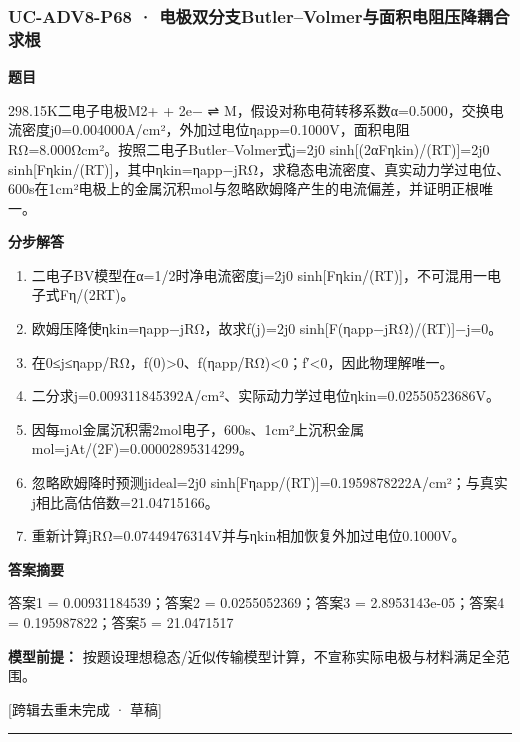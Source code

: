 \documentclass[UTF8,11pt,a4paper]{ctexart}
\begin{document}
\subsubsection*{UC-ADV8-P68 · 电极双分支Butler–Volmer与面积电阻压降耦合求根}
\noindent\textbf{题目}\par
298.15K二电子电极M2+ + 2e− ⇌ M，假设对称电荷转移系数α=0.5000，交换电流密度j0=0.004000A/cm²，外加过电位ηapp=0.1000V，面积电阻RΩ=8.000Ωcm²。按照二电子Butler–Volmer式j=2j0 sinh[(2αFηkin)/(RT)]=2j0 sinh[Fηkin/(RT)]，其中ηkin=ηapp−jRΩ，求稳态电流密度、真实动力学过电位、600s在1cm²电极上的金属沉积mol与忽略欧姆降产生的电流偏差，并证明正根唯一。\par
\medskip\noindent\textbf{分步解答}
\begin{enumerate}
\item 二电子BV模型在α=1/2时净电流密度j=2j0 sinh[Fηkin/(RT)]，不可混用一电子式Fη/(2RT)。
\item 欧姆压降使ηkin=ηapp−jRΩ，故求f(j)=2j0 sinh[F(ηapp−jRΩ)/(RT)]−j=0。
\item 在0≤j≤ηapp/RΩ，f(0)>0、f(ηapp/RΩ)<0；f′<0，因此物理解唯一。
\item 二分求j=0.009311845392A/cm²、实际动力学过电位ηkin=0.02550523686V。
\item 因每mol金属沉积需2mol电子，600s、1cm²上沉积金属mol=jAt/(2F)=0.00002895314299。
\item 忽略欧姆降时预测jideal=2j0 sinh[Fηapp/(RT)]=0.1959878222A/cm²；与真实j相比高估倍数=21.04715166。
\item 重新计算jRΩ=0.07449476314V并与ηkin相加恢复外加过电位0.1000V。
\end{enumerate}
\noindent\textbf{答案摘要}\par
答案1 = 0.00931184539；答案2 = 0.0255052369；答案3 = 2.8953143e-05；答案4 = 0.195987822；答案5 = 21.0471517\par
\noindent\textbf{模型前提：}
按题设理想稳态/近似传输模型计算，不宣称实际电极与材料满足全范围。\par
\noindent\textcolor{red!65!black}{[跨辑去重未完成 · 草稿]} \par
\medskip\hrule\medskip
{}
\end{document}
